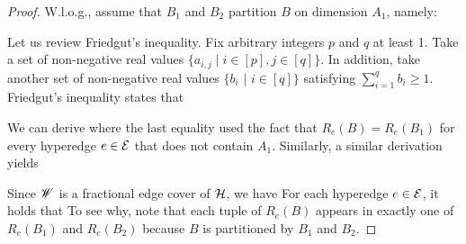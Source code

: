 \begin{proof}
   W.l.o.g., assume that $B_1$ and $B_2$ partition $B$ on dimension $A_1$, namely:

   \vgap

   Let us review Friedgut's inequality. Fix arbitrary integers $p$ and $q$ at least 1. Take a set of non-negative real values $\{a_{i,j} \mid i \in [p], j \in [q]\}$. In addition, take another set of non-negative real values $\{b_i$ $\mid$ $i \in [q]\}$ satisfying $\sum_{i=1}^{q} b_i \geq 1$.  Friedgut's inequality \cite{f04} states that

    \vgap

    We can derive
    where the last equality used the fact that $R_e(B) = R_e(B_1)$ for every hyperedge $e \in \mathcal{E}$ that does not contain $A_1$. Similarly, a similar derivation yields

    Since $\mathscr{W}$ is a fractional edge cover of $\mathcal{H}$, we have
    For each hyperedge $e \in \mathcal{E}$, it holds that
    To see why, note that each tuple of $R_e(B)$ appears in exactly one of $R_e(B_1)$ and $R_e(B_2)$ because $B$ is partitioned by $B_1$ and $B_2$.

    \vgap


\end{proof}
